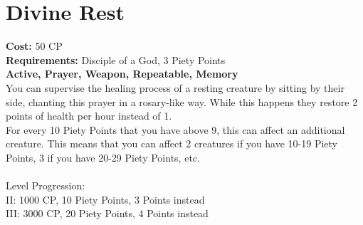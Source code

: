 \section{Divine Rest}
\textbf{Cost:} 50 CP\\
\textbf{Requirements:} Disciple of a God, 3 Piety Points \\
\textbf{Active, Prayer, Weapon, Repeatable, Memory}\\
You can supervise the healing process of a resting creature by sitting by their side, chanting this prayer in a rosary-like way. While this happens they restore 2 points of health per hour instead of 1.\\
For every 10 Piety Points that you have above 9, this can affect an additional creature. This means that you can affect 2 creatures if you have 10-19 Piety Points, 3 if you have 20-29 Piety Points, etc.\\
\\
Level Progression:\\
II: 1000 CP, 10 Piety Points, 3 Points instead\\
III: 3000 CP, 20 Piety Points, 4 Points instead\\